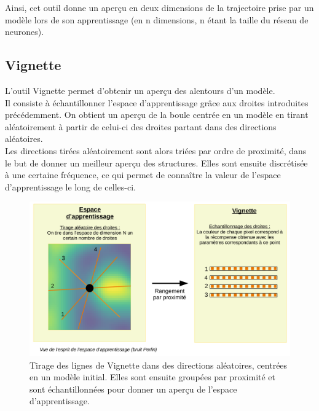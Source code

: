 \documentclass[12pt]{article}
\begin{document}
Ainsi, cet outil donne un aperçu en deux dimensions de la trajectoire prise par un modèle lors de son apprentissage (en n dimensions, n étant la taille du réseau de neurones). \\

\newpage
\subsection{Vignette} \label{vign}

L’outil Vignette permet d’obtenir un aperçu des alentours d’un modèle. \\

Il consiste à échantillonner l’espace d’apprentissage grâce aux droites introduites précédemment. On obtient un aperçu de la boule centrée en un modèle en tirant aléatoirement à partir de celui-ci des droites partant dans des directions aléatoires.\\

Les directions tirées aléatoirement sont alors triées par ordre de proximité, dans le but de donner un meilleur aperçu des structures. Elles sont ensuite discrétisée à une certaine fréquence, ce qui permet de connaître la valeur de l'espace d'apprentissage le long de celles-ci. \\

\begin{figure}[htp]
    \centering
    \includegraphics[width=18cm]{Images/vignetteDessin}
    \caption{Tirage des lignes de Vignette dans des directions aléatoires, centrées en un modèle initial. Elles sont ensuite groupées par proximité et sont échantillonnées pour donner un aperçu de l'espace d'apprentissage.}
    \label{fig:vignetteDessin}
\end{figure}
\end{document}
